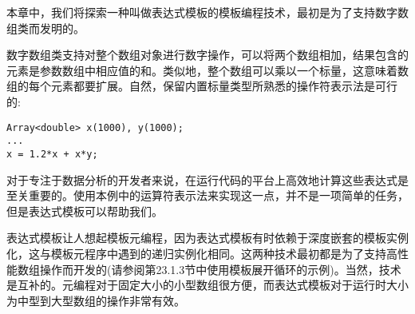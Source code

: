 本章中，我们将探索一种叫做表达式模板的模板编程技术，最初是为了支持数字数组类而发明的。

数字数组类支持对整个数组对象进行数字操作，可以将两个数组相加，结果包含的元素是参数数组中相应值的和。类似地，整个数组可以乘以一个标量，这意味着数组的每个元素都要扩展。自然，保留内置标量类型所熟悉的操作符表示法是可行的:

\begin{lstlisting}[style=styleCXX]
Array<double> x(1000), y(1000);
...
x = 1.2*x + x*y;
\end{lstlisting}

对于专注于数据分析的开发者来说，在运行代码的平台上高效地计算这些表达式是至关重要的。使用本例中的运算符表示法来实现这一点，并不是一项简单的任务，但是表达式模板可以帮助我们。

表达式模板让人想起模板元编程，因为表达式模板有时依赖于深度嵌套的模板实例化，这与模板元程序中遇到的递归实例化相同。这两种技术最初都是为了支持高性能数组操作而开发的(请参阅第23.1.3节中使用模板展开循环的示例)。当然，技术是互补的。元编程对于固定大小的小型数组很方便，而表达式模板对于运行时大小为中型到大型数组的操作非常有效。









































